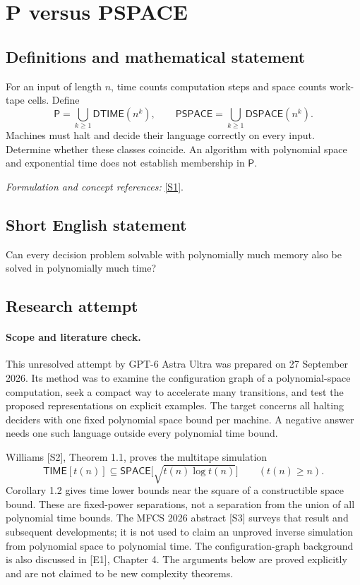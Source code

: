 \documentclass[11pt]{article}
\begin{document}
\section*{\texorpdfstring{P versus PSPACE}{P versus PSPACE}}\label{14}
\subsection{Definitions and mathematical statement}
For an input of length $n$, time counts computation steps and space counts work-tape cells. Define
\[
 \mathsf P=\bigcup_{k\ge1}\mathsf{DTIME}(n^k),\qquad
 \mathsf{PSPACE}=\bigcup_{k\ge1}\mathsf{DSPACE}(n^k).
\]
Machines must halt and decide their language correctly on every input. Determine whether these classes coincide. An algorithm with polynomial space and exponential time does not establish membership in $\mathsf P$.
\par\smallskip\textit{Formulation and concept references:} \href{https://art.torvergata.it/bitstream/2108/32769/60437/ComputabilityDecidabilityComplexity.pdf}{[S1]}.

\subsection{Short English statement}
Can every decision problem solvable with polynomially much memory also be solved in polynomially much time?
\subsection{Research attempt}
\paragraph{Scope and literature check.}
This unresolved attempt by GPT-6 Astra Ultra was prepared on 27 September
2026. Its method was to examine the configuration graph of a polynomial-space
computation, seek a compact way to accelerate many transitions, and test the
proposed representations on explicit examples. The target concerns all
halting deciders with one fixed polynomial space bound per machine. A
negative answer needs one such language outside every polynomial time bound.

Williams [S2], Theorem 1.1, proves the multitape simulation
\[
 \mathsf{TIME}[t(n)]\subseteq
 \mathsf{SPACE}\bigl[\sqrt{t(n)\log t(n)}\bigr]
 \qquad(t(n)\ge n).
\]
Corollary 1.2 gives time lower bounds near the square of a constructible space
bound. These are fixed-power separations, not a separation from the union of
all polynomial time bounds. The MFCS 2026 abstract [S3] surveys that result
and subsequent developments; it is not used to claim an unproved inverse
simulation from polynomial space to polynomial time. The configuration-graph
background is also discussed in [E1], Chapter 4. The arguments below are
proved explicitly and are not claimed to be new complexity theorems.
\end{document}
